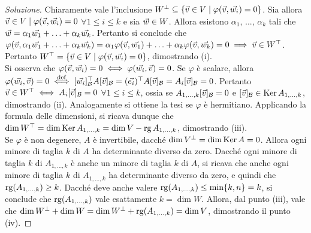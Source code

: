 \begin{proof}[Soluzione]
	Chiaramente vale l'inclusione $W^\perp \subseteq \{ \v \in V \mid \varphi(\v, \ww i) = 0 \}$. Sia
	allora $\v \in V \mid \varphi(\v, \ww i) = 0$ $\forall 1 \leq i \leq k$ e sia $\w \in W$. Allora esistono $\alpha_1$, ..., $\alpha_k$ tali
	che $\w = \alpha_1 \ww 1 + \ldots + \alpha_k \ww k$. Pertanto si conclude che $\varphi(\v, \alpha_1 \ww 1 + \ldots + \alpha_k \ww k) = \alpha_1 \varphi(\v, \ww 1) + \ldots + \alpha_k \varphi(\v, \ww k) = 0 \implies \v \in W^\top$. Pertanto $W^\top = \{ \v \in V \mid \varphi(\v, \ww i) = 0 \}$, dimostrando (i). \\
	
	Si osserva che $\varphi(\v, \ww i) = 0 \iff \varphi(\ww i, \v) = 0$. Se $\varphi$ è scalare, allora
	$\varphi(\ww i, \v) = 0 \defiff [\ww i]_\basis^\top A [\v]_\basis = (\e i)^\top A [\v]_\basis = A_i [\v]_\basis = 0$. Pertanto $\v \in W^\top \iff A_i [\v]_\basis = 0$ $\forall 1 \leq i \leq k$, ossia se
	$A_{1, \ldots, k} [\v]_\basis = 0$ e $[\v]_\basis \in \Ker A_{1, \ldots, k}$, dimostrando (ii). Analogamente
	si ottiene la tesi se $\varphi$ è hermitiano.
	Applicando la formula delle dimensioni, si ricava dunque che $\dim W^\top = \dim \operatorname{Ker} A_{1, \ldots, k} =
	\dim V - \operatorname{rg} A_{1, \ldots, k}$, dimostrando (iii). \\
	
	Se $\varphi$ è non degenere, $A$ è invertibile, dacché $\dim V^\perp = \dim \operatorname{Ker} A = 0$. Allora
	ogni minore di taglia $k$ di $A$ ha determinante diverso da zero. Dacché ogni minore di taglia $k$
	di $A_{1,\ldots,k}$ è anche un minore di taglia $k$ di $A$, si ricava che anche ogni minore di taglia
	$k$ di $A_{1, \ldots, k}$ ha determinante diverso da zero, e quindi che $\operatorname{rg}(A_{1,\ldots,k}) \geq k$.
	Dacché deve anche valere $\operatorname{rg}(A_{1,\ldots,k}) \leq \min\{k,n\} = k$, si conclude che $\operatorname{rg}(A_{1,\ldots,k})$
	vale esattamente $k = \dim W$. Allora, dal punto (iii), vale che $\dim W^\perp + \dim W = \dim W^\perp + \operatorname{rg}(A_{1,\ldots,k}) = \dim V$, dimostrando il punto (iv).
\end{proof}

